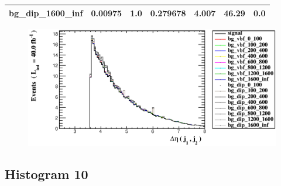 \documentclass[a4paper, 10pt]{article}
\begin{document}
\begin{table}[H]
\begin{center}
\begin{tabular}{|m{23.0mm}|m{23.0mm}|m{18.0mm}|m{19.0mm}|m{19.0mm}|m{19.0mm}|m{19.0mm}|}
      \hline
      {\cellcolor{white}         bg\_dip\_1600\_inf}& {\cellcolor{white}         0.00975}& {\cellcolor{white}         1.0}& {\cellcolor{white}         0.279678}& {\cellcolor{white}         4.007}& {\cellcolor{red}         46.29}& {\cellcolor{red}         0.0}\\
\hline
    \end{tabular}
  \end{center}
\end{table}

\begin{figure}[H]
  \begin{center}
    \includegraphics[scale=0.45]{selection_8.eps}\\
\caption{   }
  \end{center}
\end{figure}
      \newpage
\subsection{ Histogram 10}
\end{document}
